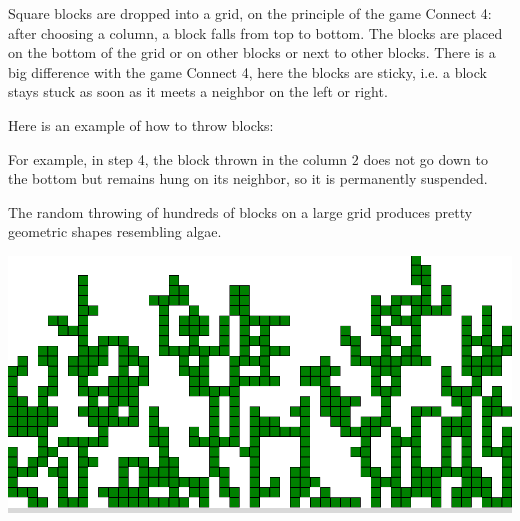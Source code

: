 \documentclass[11pt,class=report,crop=false]{standalone}
\begin{document}
\begin{cours}
Square blocks are dropped into a grid, on the principle of the game \og{}Connect 4\fg{}: after choosing a column, a block falls from top to bottom. The blocks are placed on the bottom of the grid or on other blocks or next to other blocks. There is a big difference with the game \og{}Connect 4\fg{}, here the blocks are \og{}sticky\fg{}, i.e. a block stays stuck as soon as it meets a neighbor on the left or right.


Here is an example of how to throw blocks:

For example, in step 4, the block thrown in the column $2$ does not go down to the bottom but remains hung on its neighbor, so it is permanently suspended.

The random throwing of hundreds of blocks on a large grid produces pretty geometric shapes resembling algae.

\begin{center}
\includegraphics[scale=\myscale,scale=0.3]{screen-blocks-bloc0}
\end{center}

\end{cours}



\end{document}
